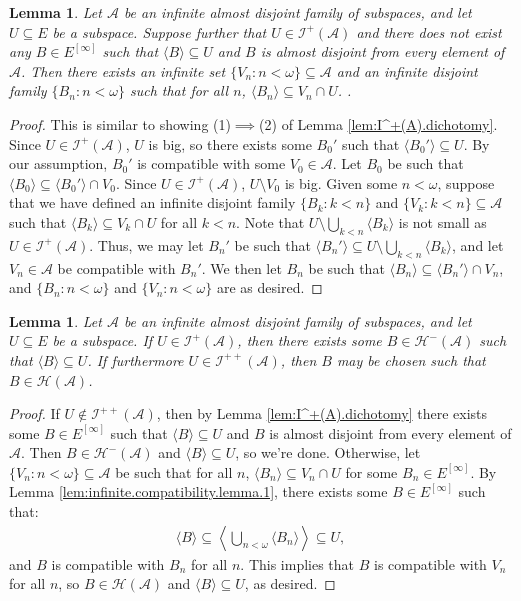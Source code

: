 \documentclass[11pt,reqno]{amsart}
\theoremstyle{plain}
\numberwithin{equation}{section}
\newtheorem{lemma}[theorem]{Lemma}
\theoremstyle{definition}
\renewcommand{\c}[1]{\langle #1 \rangle}
\newcommand{\cal}{\mathcal}
\newcommand{\A}{\cal{A}}
\renewcommand{\H}{\cal{H}}
\newcommand{\I}{\cal{I}}
\begin{document}
\begin{lemma}
\label{lem:infinite.compatibility.lemma.2}
    Let $\A$ be an infinite almost disjoint family of subspaces, and let $U \subseteq E$ be a subspace. Suppose further that $U \in \I^+(\A)$ and there does not exist any $B \in E^{[\infty]}$ such that $\c{B} \subseteq U$ and $B$ is almost disjoint from every element of $\A$. Then there exists an infinite set $\{V_n : n < \omega\} \subseteq \A$ and an infinite disjoint family $\{B_n : n < \omega\}$ such that for all $n$, $\c{B_n} \subseteq V_n \cap U$. .
\end{lemma}

\begin{proof}
    This is similar to showing (1)$\implies$(2) of Lemma \ref{lem:I^+(A).dichotomy}. Since $U \in \I^+(\A)$, $U$ is big, so there exists some $B_0'$ such that $\c{B_0'} \subseteq U$. By our assumption, $B_0'$ is compatible with some $V_0 \in \A$. Let $B_0$ be such that $\c{B_0} \subseteq \c{B_0'} \cap V_0$. Since $U \in \I^+(\A)$, $U \setminus V_0$ is big. Given some $n < \omega$, suppose that we have defined an infinite disjoint family $\{B_k : k < n\}$ and $\{V_k : k < n\} \subseteq \A$ such that $\c{B_k} \subseteq V_k \cap U$ for all $k < n$. Note that $U \setminus \bigcup_{k<n} \c{B_k}$ is not small as $U \in \I^+(\A)$. Thus, we may let $B_n'$ be such that $\c{B_n'} \subseteq U \setminus \bigcup_{k<n} \c{B_k}$, and let $V_n \in \A$ be compatible with $B_n'$. We then let $B_n$ be such that $\c{B_n} \subseteq \c{B_n'} \cap V_n$, and $\{B_n : n < \omega\}$ and $\{V_n : n <\omega\}$ are as desired.
\end{proof}

\begin{lemma}
\label{lem:block.refinement.lemma}
    Let $\A$ be an infinite almost disjoint family of subspaces, and let $U \subseteq E$ be a subspace. If $U \in \I^+(\A)$, then there exists some $B \in \H^-(\A)$ such that $\c{B} \subseteq U$. If furthermore $U \in \I^{++}(\A)$, then $B$ may be chosen such that $B \in \H(\A)$.
\end{lemma}

\begin{proof}
    If $U \notin \I^{++}(\A)$, then by Lemma \ref{lem:I^+(A).dichotomy} there exists some $B \in E^{[\infty]}$ such that $\c{B} \subseteq U$ and $B$ is almost disjoint from every element of $\A$. Then $B \in \H^-(\A)$ and $\c{B} \subseteq U$, so we're done. Otherwise, let $\{V_n : n < \omega\} \subseteq \A$ be such that for all $n$, $\c{B_n} \subseteq V_n \cap U$ for some $B_n \in E^{[\infty]}$. By Lemma \ref{lem:infinite.compatibility.lemma.1}, there exists some $B \in E^{[\infty]}$ such that:
    \begin{align*}
        \c{B} \subseteq \left\langle\bigcup_{n<\omega}\c{B_n}\right\rangle \subseteq U,
    \end{align*}
    and $B$ is compatible with $B_n$ for all $n$. This implies that $B$ is compatible with $V_n$ for all $n$, so $B \in \H(\A)$ and $\c{B} \subseteq U$, as desired.
\end{proof}
\end{document}
